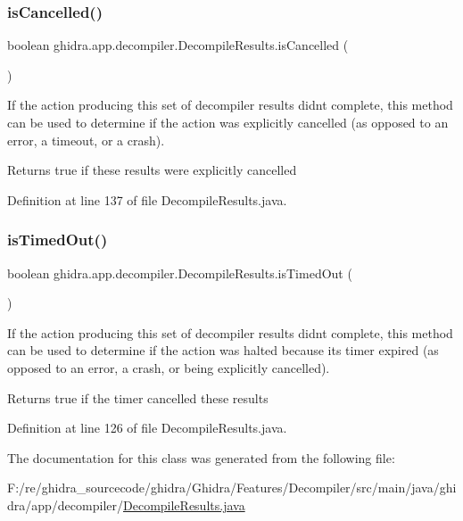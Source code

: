 \subsubsection{\texorpdfstring{isCancelled()}{isCancelled()}}
{\footnotesize\ttfamily boolean ghidra.\+app.\+decompiler.\+Decompile\+Results.\+is\+Cancelled (\begin{DoxyParamCaption}{ }\end{DoxyParamCaption})\hspace{0.3cm}{\ttfamily [inline]}}

If the action producing this set of decompiler results didn\textquotesingle{}t complete, this method can be used to determine if the action was explicitly cancelled (as opposed to an error, a timeout, or a crash). \begin{DoxyReturn}{Returns}
true if these results were explicitly cancelled 
\end{DoxyReturn}


Definition at line 137 of file Decompile\+Results.\+java.

\mbox{\label{classghidra_1_1app_1_1decompiler_1_1_decompile_results_a09090a559208bc50b2490ca3f14898b0}} 
\subsubsection{\texorpdfstring{isTimedOut()}{isTimedOut()}}
{\footnotesize\ttfamily boolean ghidra.\+app.\+decompiler.\+Decompile\+Results.\+is\+Timed\+Out (\begin{DoxyParamCaption}{ }\end{DoxyParamCaption})\hspace{0.3cm}{\ttfamily [inline]}}

If the action producing this set of decompiler results didn\textquotesingle{}t complete, this method can be used to determine if the action was halted because its timer expired (as opposed to an error, a crash, or being explicitly cancelled). \begin{DoxyReturn}{Returns}
true if the timer cancelled these results 
\end{DoxyReturn}


Definition at line 126 of file Decompile\+Results.\+java.



The documentation for this class was generated from the following file\+:\begin{DoxyCompactItemize}
\item 
F\+:/re/ghidra\+\_\+sourcecode/ghidra/\+Ghidra/\+Features/\+Decompiler/src/main/java/ghidra/app/decompiler/\mbox{\hyperlink{_decompile_results_8java}{Decompile\+Results.\+java}}\end{DoxyCompactItemize}
